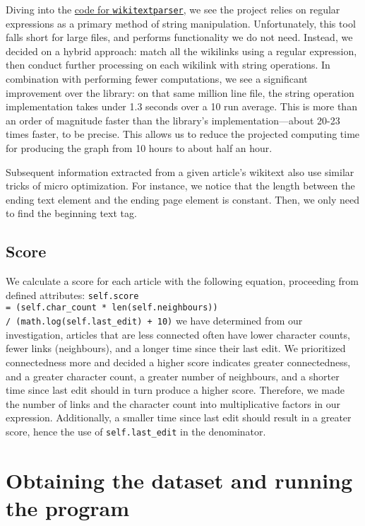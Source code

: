 \documentclass[fontsize=12pt]{article}
\newcommand{\py}[1]{\texttt{#1}}
\begin{document}
\begin{multicols}{2}
    Diving into the \href{https://github.com/5j9/wikitextparser/blob/master/wikitextparser/_wikilink.py}{code for \py{wikitextparser}}, we see the project relies on regular expressions as a primary method of string manipulation.
    Unfortunately, this tool falls short for large files, and performs functionality we do not need.
    Instead, we decided on a hybrid approach: match all the wikilinks using a regular expression, then conduct further processing on each wikilink with string operations.
    In combination with performing fewer computations, we see a significant improvement over the library: on that same million line file, the string operation implementation takes under 1.3 seconds over a 10 run average.
    This is more than an order of magnitude faster than the library's implementation---about 20-23 times faster, to be precise.
    This allows us to reduce the projected computing time for producing the graph from 10 hours to about half an hour.

    Subsequent information extracted from a given article's wikitext also use similar tricks of micro optimization.
    For instance, we notice that the length between the ending text element and the ending page element is constant.
    Then, we only need to find the beginning text tag.

    \subsection{Score}
    We calculate a score for each article with the following equation, proceeding from defined attributes: \py{self.score} \\ \py{= (self.char_count * len(self.neighbours))} \\ \py{/ (math.log(self.last_edit) + 10)} we have determined from our investigation, articles that are less connected often have lower character counts, fewer links (neighbours), and a longer time since their last edit.
    We prioritized connectedness more and decided a higher score indicates greater connectedness, and a greater character count, a greater number of neighbours, and a shorter time since last edit should in turn produce a higher score.
    Therefore, we made the number of links and the character count into multiplicative factors in our expression.
    Additionally, a smaller time since last edit should result in a greater score, hence the use of \texttt{self.last\_edit} in the denominator.

\section{Obtaining the dataset and running the program}


\end{multicols}
\end{document}
